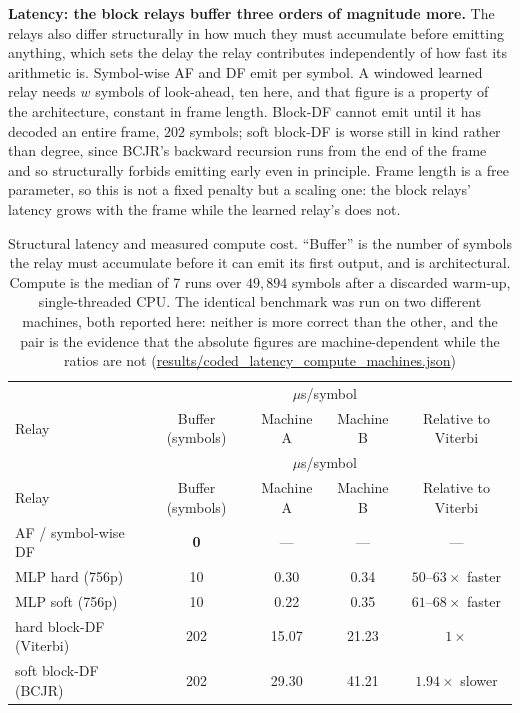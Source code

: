 \textbf{Latency: the block relays buffer three orders of magnitude more.} The relays also differ structurally in how much they must accumulate before emitting anything, which sets the delay the relay contributes independently of how fast its arithmetic is. Symbol-wise AF and DF emit per symbol. A windowed learned relay needs $w$ symbols of look-ahead, ten here, and that figure is a property of the architecture, constant in frame length. Block-DF cannot emit until it has decoded an entire frame, $202$ symbols; soft block-DF is worse still in kind rather than degree, since BCJR's backward recursion runs from the end of the frame and so structurally forbids emitting early even in principle. Frame length is a free parameter, so this is not a fixed penalty but a scaling one: the block relays' latency grows with the frame while the learned relay's does not.

\begin{longtable}[]{@{}lcccc@{}}
\caption[Latency and compute cost of the coded relays]{Structural latency and measured compute cost. ``Buffer'' is the number of symbols the relay must accumulate before it can emit its first output, and is architectural. Compute is the median of 7 runs over $49{,}894$ symbols after a discarded warm-up, single-threaded CPU. The identical benchmark was run on two different machines, both reported here: neither is more correct than the other, and the pair is the evidence that the absolute figures are machine-dependent while the ratios are not (\url{results/coded_latency_compute_machines.json})}\label{tbl:table41}\tabularnewline
\toprule\noalign{}
 &  & \multicolumn{2}{c}{$\mu$s/symbol} &  \\
Relay & Buffer (symbols) & Machine A & Machine B & Relative to Viterbi \\
\midrule\noalign{}
\endfirsthead
\toprule\noalign{}
 &  & \multicolumn{2}{c}{$\mu$s/symbol} &  \\
Relay & Buffer (symbols) & Machine A & Machine B & Relative to Viterbi \\
\midrule\noalign{}
\endhead
\bottomrule\noalign{}
\endlastfoot
AF / symbol-wise DF & \textbf{0} & --- & --- & --- \\
MLP hard (756p) & 10 & 0.30 & 0.34 & $50$--$63\times$ faster \\
MLP soft (756p) & 10 & 0.22 & 0.35 & $61$--$68\times$ faster \\
hard block-DF (Viterbi) & 202 & 15.07 & 21.23 & $1\times$ \\
soft block-DF (BCJR) & 202 & 29.30 & 41.21 & $1.94\times$ slower \\
\end{longtable}

